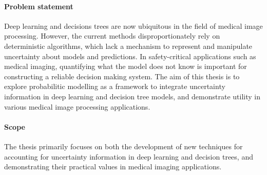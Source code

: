\documentclass[12pt,a4paper,twoside]{book}
\begin{document}
\paragraph{Problem statement}
Deep learning and decisions trees are now ubiquitous in the field of medical image processing. However, the current methods disproportionately rely on deterministic algorithms, which lack a mechanism to represent and manipulate uncertainty about models and predictions. In safety-critical applications such as medical imaging, quantifying what the model does not know is important for constructing a reliable decision making system. The aim of this thesis is to explore probabilitic modelling as a framework to integrate uncertainty information in deep learning and decision tree models, and demonstrate utility in various medical image processing applications. 

\paragraph{Scope}
The thesis primarily focuses on both the development of new techniques for accounting for uncertainty information in deep learning and decision trees, and demonstrating their practical values in medical imaging applications. 
\end{document}
